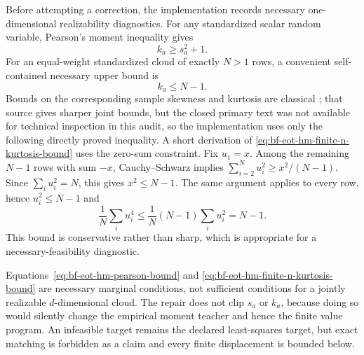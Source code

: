 Before attempting a correction, the implementation records necessary
one-dimensional realizability diagnostics.  For any standardized scalar
random variable, Pearson's moment inequality gives
\begin{equation}
 k_a\geq s_a^2+1.
 \label{eq:bf-eot-hm-pearson-bound}
\end{equation}
For an equal-weight standardized cloud of exactly \(N>1\) rows, a convenient
self-contained necessary upper bound is
\begin{equation}
 k_a\leq N-1.
 \label{eq:bf-eot-hm-finite-n-kurtosis-bound}
\end{equation}
Bounds on the corresponding sample skewness and kurtosis are classical
\citep{johnson1979bounds}; that source gives sharper joint bounds, but the
closed primary text was not available for technical inspection in this audit,
so the implementation uses only the following directly proved inequality.  A
short derivation of
\eqref{eq:bf-eot-hm-finite-n-kurtosis-bound} uses the zero-sum constraint.
Fix \(u_1=x\).  Among the remaining \(N-1\) rows with sum \(-x\),
Cauchy--Schwarz implies
\(
 \sum_{i=2}^N u_i^2\geq x^2/(N-1)
\).
Since \(\sum_i u_i^2=N\), this gives
\(
 x^2\leq N-1
\).  The same argument applies to every row, hence
\(u_i^2\leq N-1\) and
\[
 \frac1N\sum_i u_i^4
 \leq \frac1N (N-1)\sum_i u_i^2
 =N-1.
\]
This bound is conservative rather than sharp, which is appropriate for a
necessary-feasibility diagnostic.

Equations~\eqref{eq:bf-eot-hm-pearson-bound} and
\eqref{eq:bf-eot-hm-finite-n-kurtosis-bound} are necessary marginal conditions,
not sufficient conditions for a jointly realizable \(d\)-dimensional cloud.
The repair does not clip \(s_a\) or \(k_a\), because doing so would silently
change the empirical moment teacher and hence the finite value program.  An
infeasible target remains the declared least-squares target, but exact matching
is forbidden as a claim and every finite displacement is bounded below.

